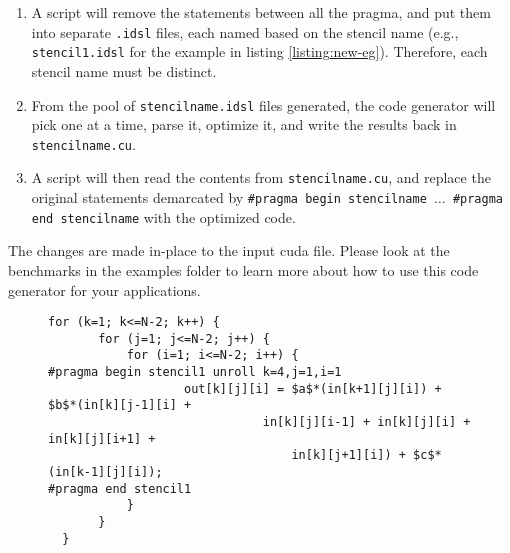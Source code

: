\begin{enumerate} 
\item A script will remove the statements between all the pragma, and put them
into separate \texttt{.idsl} files, each named based on the stencil name (e.g.,
\texttt{stencil1.idsl} for the example in listing \ref{listing:new-eg}).
Therefore, each stencil name must be distinct.
\item From the pool of \texttt{stencilname.idsl} files generated, the code
generator will pick one at a time, parse it, optimize it, and write the results
back in \texttt{stencilname.cu}.  
\item A script will then read the contents from \texttt{stencilname.cu}, and
replace the original statements demarcated by \texttt{\#pragma begin
stencilname $\ldots$ \#pragma end stencilname} with the optimized code. 
\end{enumerate} 
The changes are made in-place to the input cuda file.
Please look at the benchmarks in the examples folder to learn more about how to use this
code generator for your applications. 
 
\begin{figure}[t!]
\vspace*{-1em}
\begin{lstlisting}[escapechar=@,caption={The input representation with pragmas},label={listing:new-eg}]
  for (k=1; k<=N-2; k++) {
       for (j=1; j<=N-2; j++) {
           for (i=1; i<=N-2; i++) {
#pragma begin stencil1 unroll k=4,j=1,i=1
                   out[k][j][i] = $a$*(in[k+1][j][i]) + $b$*(in[k][j-1][i] +
                              in[k][j][i-1] + in[k][j][i] + in[k][j][i+1] +
                                  in[k][j+1][i]) + $c$*(in[k-1][j][i]);
#pragma end stencil1
           }
       }
  }
\end{lstlisting}
\end{figure}



